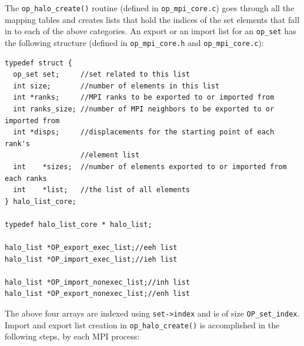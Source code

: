 \documentclass[11pt]{article}
\begin{document}
\noindent The \texttt{op\_halo\_create()} routine (defined in \texttt{op\_mpi\_core.c}) goes through all the mapping
tables and creates lists that hold the indices of the set elements that fall in to each of the above categories. An
export or an import list for an \texttt{op\_set} has the following structure (defined in \texttt{op\_mpi\_core.h} and
\texttt{op\_mpi\_core.c}):\vspace{-0pt}
\begin{verbatim}
typedef struct {
  op_set set;     //set related to this list
  int size;       //number of elements in this list
  int *ranks;     //MPI ranks to be exported to or imported from
  int ranks_size; //number of MPI neighbors to be exported to or imported from
  int *disps;     //displacements for the starting point of each rank's
                  //element list
  int    *sizes;  //number of elements exported to or imported from each ranks
  int    *list;   //the list of all elements
} halo_list_core;

typedef halo_list_core * halo_list;

halo_list *OP_export_exec_list;//eeh list
halo_list *OP_import_exec_list;//ieh list

halo_list *OP_import_nonexec_list;//inh list
halo_list *OP_export_nonexec_list;//enh list
\end{verbatim}
\noindent The above four arrays are indexed using \texttt{set->index} and is of
size \texttt{OP\_set\_index}. Import and export list creation in
\texttt{op\_halo\_create()} is accomplished in the following steps, by each MPI
process:
\end{document}

